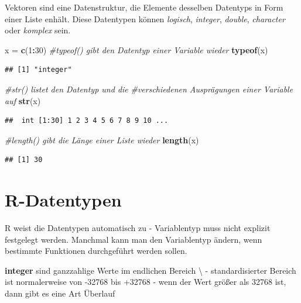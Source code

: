 \documentclass[]{book}
\newenvironment{Shaded}{\begin{snugshade}}{\end{snugshade}}
\newcommand{\KeywordTok}[1]{\textcolor[rgb]{0.13,0.29,0.53}{\textbf{#1}}}
\newcommand{\DecValTok}[1]{\textcolor[rgb]{0.00,0.00,0.81}{#1}}
\newcommand{\StringTok}[1]{\textcolor[rgb]{0.31,0.60,0.02}{#1}}
\newcommand{\CommentTok}[1]{\textcolor[rgb]{0.56,0.35,0.01}{\textit{#1}}}
\newcommand{\OperatorTok}[1]{\textcolor[rgb]{0.81,0.36,0.00}{\textbf{#1}}}
\newcommand{\NormalTok}[1]{#1}
\begin{document}
Vektoren sind eine Datenstruktur, die Elemente desselben Datentyps in
Form einer Liste enhält. Diese Datentypen können \emph{logisch},
\emph{integer}, \emph{double}, \emph{character} oder \emph{komplex}
sein.

\begin{Shaded}
\begin{Highlighting}[]
\NormalTok{x =}\StringTok{ }\KeywordTok{c}\NormalTok{(}\DecValTok{1}\OperatorTok{:}\DecValTok{30}\NormalTok{)}
\CommentTok{#typeof() gibt den Datentyp einer Variable wieder }
\KeywordTok{typeof}\NormalTok{(x)}
\end{Highlighting}
\end{Shaded}

\begin{verbatim}
## [1] "integer"
\end{verbatim}

\begin{Shaded}
\begin{Highlighting}[]
\CommentTok{#str() listet den Datentyp und die }
\CommentTok{#verschiedenen Ausprägungen einer Variable auf}
\KeywordTok{str}\NormalTok{(x)}
\end{Highlighting}
\end{Shaded}

\begin{verbatim}
##  int [1:30] 1 2 3 4 5 6 7 8 9 10 ...
\end{verbatim}

\begin{Shaded}
\begin{Highlighting}[]
\CommentTok{#length() gibt die Länge einer Liste wieder}
\KeywordTok{length}\NormalTok{(x)}
\end{Highlighting}
\end{Shaded}

\begin{verbatim}
## [1] 30
\end{verbatim}

\section{R-Datentypen}\label{r-datentypen}

R weist die Datentypen automatisch zu - Variablentyp muss nicht explizit
festgelegt werden. Manchmal kann man den Variablentyp ändern, wenn
bestimmte Funktionen durchgeführt werden sollen.

\textbf{integer} sind ganzzahlige Werte im endlichen Bereich
\textbackslash{} - standardisierter Bereich ist normalerweise von -32768
bis +32768 - wenn der Wert größer als 32768 ist, dann gibt es eine Art
Überlauf
\end{document}
